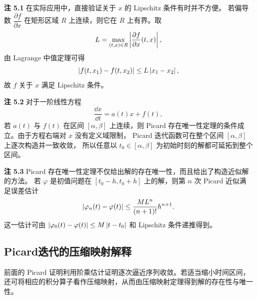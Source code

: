 \noindent\textbf{注 5.1}\quad
在实际应用中，直接验证关于 $x$ 的 Lipschitz 条件有时并不方便。
若偏导数 $\dfrac{\partial f}{\partial x}$ 在矩形区域 $R$ 上连续，则它在
$R$ 上有界。取
\[
L=\max_{(t,x)\in R}
\left| \dfrac{\partial f}{\partial x}(t,x) \right|,
\]
由 Lagrange 中值定理可得
\[
\left| f(t,x_1)-f(t,x_2) \right|
\leq L\left| x_1-x_2 \right|,
\]
故 $f$ 关于 $x$ 满足 Lipschitz 条件。

\noindent\textbf{注 5.2}\quad
对于一阶线性方程
\[
\dfrac{\dd x}{\dd t}=a(t)x+f(t),
\]
若 $a(t)$ 与 $f(t)$ 在区间 $[\alpha,\beta]$ 上连续，则 Picard
存在唯一性定理的条件成立。由于方程右端对 $x$ 没有定义域限制，
Picard 迭代函数可在整个区间 $[\alpha,\beta]$ 上逐次构造并一致收敛，
所以任意以 $t_0\in[\alpha,\beta]$ 为初始时刻的解都可延拓到整个区间。

\noindent\textbf{注 5.3}\quad
Picard 存在唯一性定理不仅给出解的存在唯一性，而且给出了构造近似解的方法。
若 $\varphi$ 是初值问题在 $[t_0-h,t_0+h]$ 上的解，则第 $n$ 次
Picard 近似满足误差估计
\[
\left| \varphi_n(t)-\varphi(t) \right|
\leq
\dfrac{ML^n}{(n+1)!}h^{n+1}.
\]
这一估计可由
$\left| \varphi_0(t)-\varphi(t) \right|\leq M\left| t-t_0 \right|$
和 Lipschitz 条件递推得到。

\subsection*{Picard迭代的压缩映射解释}
\label{sec:picard-contraction}
前面的 Picard 证明利用阶乘估计证明逐次逼近序列收敛。若适当缩小时间区间，还可将相应的积分算子看作压缩映射，从而由压缩映射定理得到解的存在性与唯一性。

